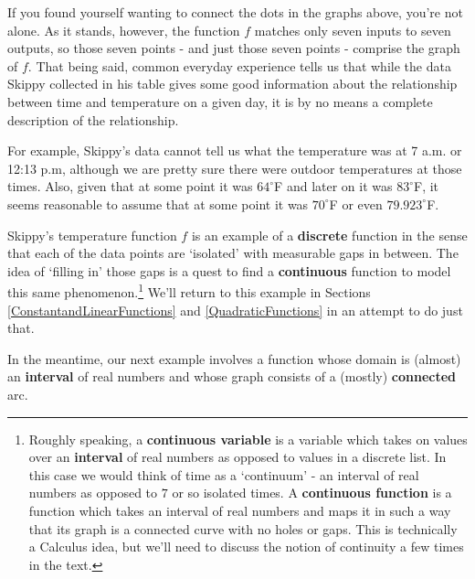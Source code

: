 \documentclass{ximera}
\begin{document}


If you found yourself wanting to connect the dots in the graphs above, you're not alone.  As it stands, however, the function $f$ matches only seven inputs to seven outputs, so those seven points - and just those seven points - comprise the graph of $f$.  That being said, common everyday experience tells us that while the data Skippy collected in his table gives some good information about the relationship between time and temperature on a given day, it is by no means a complete description of the relationship.  

 

For example, Skippy's data cannot tell us what the temperature was at 7 a.m. or 12:13 p.m, although we are pretty sure there were outdoor temperatures at those times.  Also, given that at some point it was $64^{\circ}$F and later on it was $83^{\circ}$F, it seems reasonable to assume that at some point it was $70^{\circ}$F or even $79.923^{\circ}$F.  

 

Skippy's temperature function $f$ is an example of a  \textbf{discrete} function in the sense that each of the data points are `isolated' with measurable gaps in between.  The idea of `filling in' those gaps is a quest to find a  \textbf{continuous} function to model this same phenomenon.\footnote{Roughly speaking, a \textbf{continuous variable} is a variable which takes on values over an \textbf{interval} of real numbers as opposed to values in a discrete list. In this case we would think of time as a `continuum' - an interval of real numbers as opposed to $7$ or so isolated times.  A \textbf{continuous function} is a function which takes an interval of real numbers and maps it in such a way that its graph is a connected curve with no holes or gaps. This is technically a Calculus idea, but we'll need to discuss the notion of continuity a few times in the text.} We'll return to this example in Sections \ref{ConstantandLinearFunctions} and \ref{QuadraticFunctions} in an attempt to do just that. 

 

In the meantime, our next example involves a function whose domain is (almost) an \textbf{interval} of real numbers and whose graph consists of a (mostly) \textbf{connected} arc.

 
\end{document}
